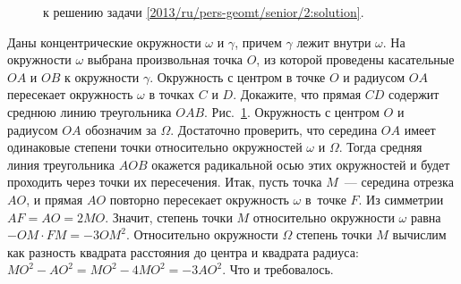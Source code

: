 \ifsolution
\begin{figure}\centering
    \caption{к решению задачи \ref{2013/ru/pers-geomt/senior/2:solution}.}
    \label{2013/ru/pers-geomt/senior/2:solution:fig}
\end{figure}%
\fi %

\problem
Даны концентрические окружности $\omega$ и $\gamma$, причем $\gamma$ лежит
внутри $\omega$.
На окружности $\omega$ выбрана произвольная точка $O$, из которой проведены
касательные $OA$ и $OB$ к окружности $\gamma$.
Окружность с центром в точке $O$ и радиусом $OA$ пересекает окружность $\omega$
в точках $C$ и $D$.
Докажите, что прямая $CD$ содержит среднюю линию треугольника $OAB$.
\solution
\label{2013/ru/pers-geomt/senior/2:solution}%
Рис.~\ref{2013/ru/pers-geomt/senior/2:solution:fig}.
Окружность с центром $O$ и радиусом $OA$ обозначим за $\Omega$.
Достаточно проверить, что середина $OA$ имеет одинаковые степени точки
относительно окружностей $\omega$ и $\Omega$.
Тогда средняя линия треугольника $AOB$ окажется радикальной осью этих
окружностей и будет проходить через точки их пересечения.
Итак, пусть точка $M$~--- середина отрезка $AO$, и прямая $AO$ повторно
пересекает окружность $\omega$ в~точке $F$.
Из симметрии $AF = AO = 2 MO$.
Значит, степень точки $M$ относительно окружности $\omega$ равна
$- OM \cdot FM = - 3 OM^2$.
Относительно окружности $\Omega$ степень точки $M$ вычислим как разность
квадрата расстояния до центра и квадрата радиуса:
$MO^2 - AO^2 = MO^2 - 4 MO^2 = - 3 AO^2$.
Что и требовалось.
\endproblem
